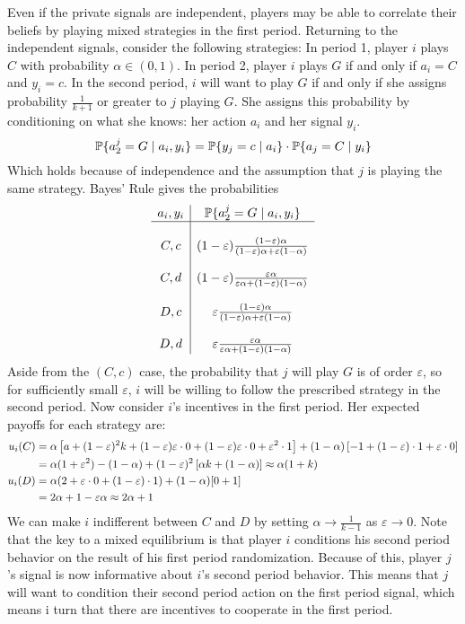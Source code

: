 \documentclass[10pt]{article}
\begin{document}
\begin{remark}
	Even if the private signals are independent, players may be able to correlate their beliefs by playing mixed strategies in the first period. Returning to the independent signals, consider the following strategies: In period 1, player $i$ plays $C$ with probability $\alpha \in (0,1)$. In period 2, player $i$ plays $G$ if and only if $a_i = C$ and $y_i = c$. In the second period, $i$ will want to play $G$ if and only if she assigns probability $\frac{1}{k+1}$ or greater to $j$ playing $G$. She assigns this probability by conditioning on what she knows: her action $a_i$ and her signal $y_i$. \[\mathbb{P}\{a_2^j = G \mid a_i,y_i\} = \mathbb{P}\{y_j = c \mid a_i\} \cdot \mathbb{P}\{a_j = C \mid y_i\}\]Which holds because of independence and the assumption that $j$ is playing the same strategy. Bayes' Rule gives the probabilities \[ \begin{array}{c|c} a_i,y_i & \mathbb{P}\{a_2^j = G \mid a_i,y_i\} \\\hline \\ C,c & (1-\varepsilon) \frac{(1-\varepsilon)\alpha}{(1-\varepsilon)\alpha + \varepsilon(1-\alpha)} \\\\ C,d & (1-\varepsilon) \frac{\varepsilon\alpha}{\varepsilon\alpha + (1-\varepsilon)(1-\alpha)} \\\\ D,c & \varepsilon \frac{(1-\varepsilon)\alpha}{(1-\varepsilon)\alpha + \varepsilon(1-\alpha)} \\\\ D,d & \varepsilon \frac{\varepsilon\alpha}{\varepsilon\alpha + (1-\varepsilon)(1-\alpha)} \end{array}\]Aside from the $(C,c)$ case, the probability that $j$ will play $G$ is of order $\varepsilon$, so for sufficiently small $\varepsilon$, $i$ will be willing to follow the prescribed strategy in the second period. Now consider $i$'s incentives in the first period. Her expected payoffs for each strategy are: \begin{align*} u_i(C) &= \alpha \left[ a + (1-\varepsilon)^2 k + (1-\varepsilon)\varepsilon \cdot 0 + (1-\varepsilon)\varepsilon \cdot 0 + \varepsilon^2 \cdot 1\right] + (1-\alpha)\left[ -1 + (1-\varepsilon) \cdot 1 + \varepsilon\cdot 0\right] \\ &= \alpha (1+\varepsilon^2) - (1-\alpha) + (1-\varepsilon)^2 \left[ \alpha k + (1-\alpha)\right] \approx \alpha (1+k) \\ u_i(D) &= \alpha (2 + \varepsilon \cdot 0 + (1-\varepsilon) \cdot 1) + (1-\alpha) [0 + 1] \\ &= 2\alpha + 1 - \varepsilon\alpha \approx 2\alpha + 1\end{align*}We can make $i$ indifferent between $C$ and $D$ by setting $\alpha \to \frac{1}{k-1}$ as $\varepsilon \to 0$. Note that the key to a mixed equilibrium is that player $i$ conditions his second period behavior on the result of his first period randomization. Because of this, player $j$'s signal is now informative about $i$'s second period behavior. This means that $j$ will want to condition their second period action on the first period signal, which means i turn that there are incentives to cooperate in the first period. 

\end{remark}
\end{document}
